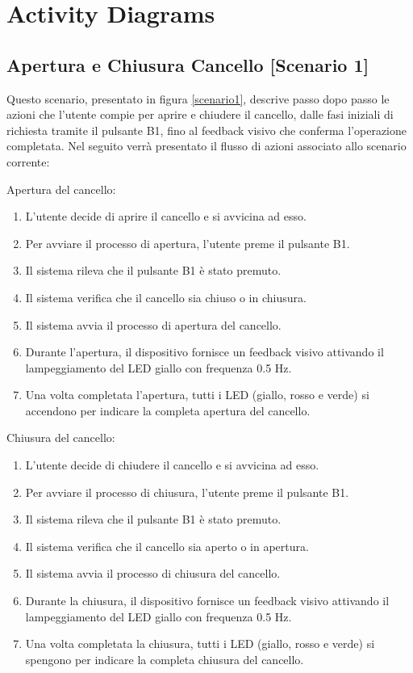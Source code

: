 \chapter{\bf{Activity Diagrams}}

\section{Apertura e Chiusura Cancello   [Scenario 1]}
Questo scenario, presentato in figura \ref{scenario1}, descrive passo dopo passo le azioni che l’utente compie per aprire e chiudere il cancello, dalle fasi iniziali di richiesta tramite il pulsante B1, fino al feedback visivo che conferma l'operazione completata. Nel seguito verrà presentato il flusso di azioni associato allo scenario corrente:

\noindent Apertura del cancello:
\begin{enumerate}
    \item L’utente decide di aprire il cancello e si avvicina ad esso.
    \item Per avviare il processo di apertura, l’utente preme il pulsante B1.
    \item Il sistema rileva che il pulsante B1 è stato premuto.
    \item Il sistema verifica che il cancello sia chiuso o in chiusura.
    \item Il sistema avvia il processo di apertura del cancello.
    \item Durante l'apertura, il dispositivo fornisce un feedback visivo attivando il lampeggiamento del LED giallo con frequenza 0.5 Hz.
    \item Una volta completata l'apertura, tutti i LED (giallo, rosso e verde) si accendono per indicare la completa apertura del cancello.
\end{enumerate}


\noindent Chiusura del cancello:
\begin{enumerate}
    \item L’utente decide di chiudere il cancello e si avvicina ad esso.
    \item Per avviare il processo di chiusura, l’utente preme il pulsante B1.
    \item Il sistema rileva che il pulsante B1 è stato premuto.
    \item Il sistema verifica che il cancello sia aperto o in apertura.
    \item Il sistema avvia il processo di chiusura del cancello.
    \item Durante la chiusura, il dispositivo fornisce un feedback visivo attivando il lampeggiamento del LED giallo con frequenza 0.5 Hz.
    \item Una volta completata la chiusura, tutti i LED (giallo, rosso e verde) si spengono per indicare la completa chiusura del cancello.
\end{enumerate}


